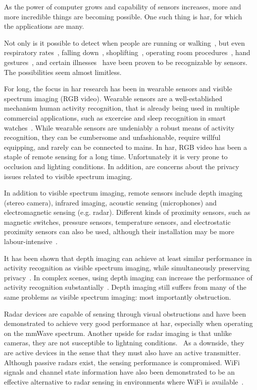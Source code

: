 As the power of computer grows and capability of sensors increases,
more and more incredible things are becoming possible.
One such thing is \gls{har},
for which the applications are many.

Not only is it possible to detect when people are running or walking~\cite{running-walking},
but even respiratory rates~\cite{breathing}, falling down~\cite{falling}, shoplifting~\cite{shoplifting},
operating room procedures~\cite{operatingroom}, hand gestures~\cite{handgestures},
and certain illnesses~\cite{parkinsson} have been proven to be recognizable by sensors.
The possibilities seem almost limitless.

For long, the focus in \gls{har} research has been in wearable sensors and visible spectrum imaging (RGB video).
Wearable sensors are a well-established mechanism human activity recognition, that is already being used in multiple commercial applications,
such as excercise and sleep recognition in smart watches~\cite{wearables}.
While wearable sensors are undeniably a robust means of activity recognition,
they can be cumbersome and unfashionable, require willful equipping, and rarely can be connected to mains.
In \gls{har}, RGB video has been a staple of remote sensing for a long time.
Unfortunately it is very prone to occlusion and lighting conditions.
In addition, are concerns about the privacy issues related to visible spectrum imaging.~\cite{sensing-survey}

In addition to visible spectrum imaging,
remote sensors include depth imaging (stereo camera),
infrared imaging, acoustic sensing (microphones) and electromagnetic sensing (e.g. radar).
Different kinds of proximity sensors, such as magnetic switches, pressure sensors, temperature sensors,
and electrostatic proximity sensors can also be used,
although their installation may be more labour-intensive~\cite{sensing-survey}.

It has been shown that depth imaging can achieve at least similar performance in activity recognition as visible spectrum imaging,
while simultaneously preserving privacy~\cite{depth}.
In complex scenes, using depth imaging can increase the performance of activity recognition substantially~\cite{depth-2}.
Depth imaging still suffers from many of the same problems as visible spectrum imaging:
most importantly obstruction.

Radar devices are capable of sensing through visual obstructions
and have been demonstrated to achieve very good performance at \gls{har},
especially when operating on the \gls{mmWave} spectrum.
Another upside for radar imaging is that unlike cameras, 
they are not susceptible to lightning conditions.~\cite{radar-survey}
As a downside, they are active devices in the sense that they must also have an active transmitter.
Although passive radars exist, the sensing performance is compromised.
WiFi signals and channel state information have also been demonstrated to be an effective alternative to radar sensing
in environments where WiFi is available~\cite{sensing-survey}.

